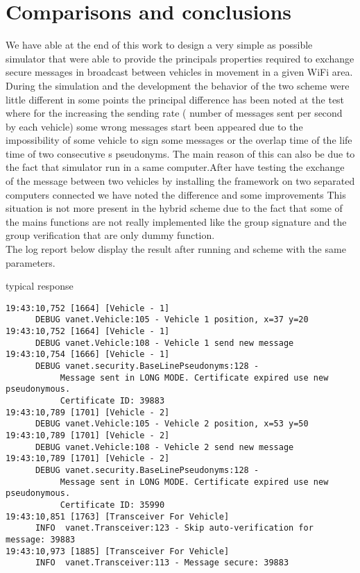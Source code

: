 \section{Comparisons and conclusions}
We have able at the end of this work to design a very simple as possible simulator that were able to provide the principals properties required to exchange secure messages in broadcast between vehicles in movement in a given WiFi area.    
During the simulation and the development the behavior of the two scheme were little different in some points the principal difference has been noted at the test where for the \baseline increasing the sending rate ( number of messages sent per  second by each vehicle) some wrong messages start been appeared due to the impossibility of some vehicle to sign some messages or the overlap time of the life time of two consecutive s pseudonyms. The main reason of this can also be due to the fact that simulator run in a same computer.After have testing the exchange of the message between two vehicles by installing the framework on two separated computers connected we have noted the difference and some improvements
This situation is not more present in the hybrid scheme due to the fact that some of the mains functions are not really implemented like the group signature and the group verification that are only dummy function.\\

The log report below display the result after running \baseline and \hybrid scheme with the same parameters.

\baseline typical response
\begin{verbatim}
19:43:10,752 [1664] [Vehicle - 1] 
      DEBUG vanet.Vehicle:105 - Vehicle 1 position, x=37 y=20
19:43:10,752 [1664] [Vehicle - 1] 
      DEBUG vanet.Vehicle:108 - Vehicle 1 send new message
19:43:10,754 [1666] [Vehicle - 1] 
      DEBUG vanet.security.BaseLinePseudonyms:128 - 
           Message sent in LONG MODE. Certificate expired use new pseudonymous. 
           Certificate ID: 39883
19:43:10,789 [1701] [Vehicle - 2] 
      DEBUG vanet.Vehicle:105 - Vehicle 2 position, x=53 y=50
19:43:10,789 [1701] [Vehicle - 2] 
      DEBUG vanet.Vehicle:108 - Vehicle 2 send new message
19:43:10,789 [1701] [Vehicle - 2] 
      DEBUG vanet.security.BaseLinePseudonyms:128 - 
           Message sent in LONG MODE. Certificate expired use new pseudonymous. 
           Certificate ID: 35990
19:43:10,851 [1763] [Transceiver For Vehicle] 
      INFO  vanet.Transceiver:123 - Skip auto-verification for message: 39883
19:43:10,973 [1885] [Transceiver For Vehicle] 
      INFO  vanet.Transceiver:113 - Message secure: 39883
\end{verbatim}

